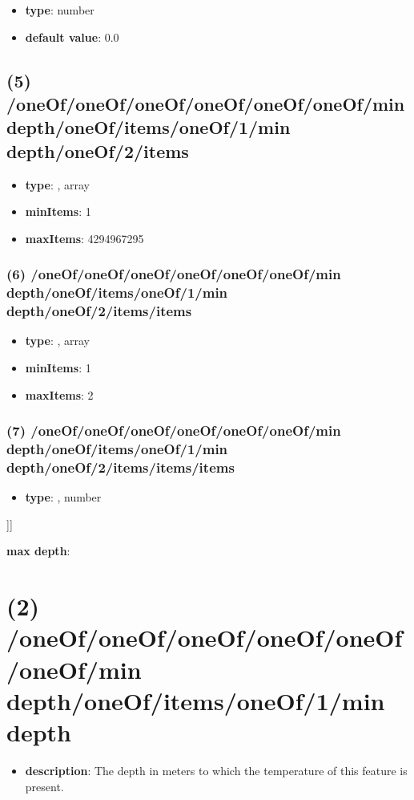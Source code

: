 \begin{itemize}[leftmargin=6em]\item {\bf type}: number\item {\bf default value}: 0.0
\end{itemize}\subsection{(5) /oneOf/oneOf/oneOf/oneOf/oneOf/oneOf/min depth/oneOf/items/oneOf/1/min depth/oneOf/2/items}
\begin{itemize}[leftmargin=5em]\item {\bf type}: , array\item {\bf minItems}: 1
\item {\bf maxItems}: 4294967295
\end{itemize}\subsubsection{(6) /oneOf/oneOf/oneOf/oneOf/oneOf/oneOf/min depth/oneOf/items/oneOf/1/min depth/oneOf/2/items/items}
\begin{itemize}[leftmargin=6em]\item {\bf type}: , array\item {\bf minItems}: 1
\item {\bf maxItems}: 2
\end{itemize}\subsubsection{(7) /oneOf/oneOf/oneOf/oneOf/oneOf/oneOf/min depth/oneOf/items/oneOf/1/min depth/oneOf/2/items/items/items}
\begin{itemize}[leftmargin=7em]\item {\bf type}: , number\end{itemize}]]\item {\bf max depth}: \section{(2) /oneOf/oneOf/oneOf/oneOf/oneOf/oneOf/min depth/oneOf/items/oneOf/1/min depth}
\begin{itemize}[leftmargin=2em]\item {\bf description}: The depth in meters to which the temperature of this feature is present.
\end{itemize}
